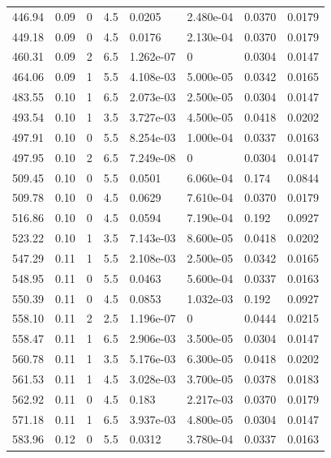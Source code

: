 \documentclass[preview]{standalone}
\begin{document}
{{{\begin{tabular}{L{1.2cm}C{1.2cm} C{0.3cm}C{0.5cm} C{1.4cm}C{1.4cm} C{1.4cm}C{1.4cm}}
  446.94  &  0.09  & 0     & 4.5 &  0.0205  & 2.480e-04  & 0.0370 &  0.0179   \\ 
  449.18  &  0.09  & 0     & 4.5 &  0.0176  & 2.130e-04  & 0.0370 &  0.0179   \\ 
  460.31  &  0.09  & 2     & 6.5 &  1.262e-07  & 0  & 0.0304 &  0.0147   \\ 
  464.06  &  0.09  & 1     & 5.5 &  4.108e-03  & 5.000e-05  & 0.0342 &  0.0165   \\ 
  483.55  &  0.10  & 1     & 6.5 &  2.073e-03  & 2.500e-05  & 0.0304 &  0.0147   \\ 
  493.54  &  0.10  & 1     & 3.5 &  3.727e-03  & 4.500e-05  & 0.0418 &  0.0202   \\ 
  497.91  &  0.10  & 0     & 5.5 &  8.254e-03  & 1.000e-04  & 0.0337 &  0.0163   \\ 
  497.95  &  0.10  & 2     & 6.5 &  7.249e-08  & 0  & 0.0304 &  0.0147   \\ 
  509.45  &  0.10  & 0     & 5.5 &  0.0501  & 6.060e-04  & 0.174 &  0.0844   \\ 
  509.78  &  0.10  & 0     & 4.5 &  0.0629  & 7.610e-04  & 0.0370 &  0.0179   \\ 
  516.86  &  0.10  & 0     & 4.5 &  0.0594  & 7.190e-04  & 0.192 &  0.0927   \\ 
  523.22  &  0.10  & 1     & 3.5 &  7.143e-03  & 8.600e-05  & 0.0418 &  0.0202   \\ 
  547.29  &  0.11  & 1     & 5.5 &  2.108e-03  & 2.500e-05  & 0.0342 &  0.0165   \\ 
  548.95  &  0.11  & 0     & 5.5 &  0.0463  & 5.600e-04  & 0.0337 &  0.0163   \\ 
  550.39  &  0.11  & 0     & 4.5 &  0.0853  & 1.032e-03  & 0.192 &  0.0927   \\ 
  558.10  &  0.11  & 2     & 2.5 &  1.196e-07  & 0  & 0.0444 &  0.0215   \\ 
  558.47  &  0.11  & 1     & 6.5 &  2.906e-03  & 3.500e-05  & 0.0304 &  0.0147   \\ 
  560.78  &  0.11  & 1     & 3.5 &  5.176e-03  & 6.300e-05  & 0.0418 &  0.0202   \\ 
  561.53  &  0.11  & 1     & 4.5 &  3.028e-03  & 3.700e-05  & 0.0378 &  0.0183   \\ 
  562.92  &  0.11  & 0     & 4.5 &  0.183  & 2.217e-03  & 0.0370 &  0.0179   \\ 
  571.18  &  0.11  & 1     & 6.5 &  3.937e-03  & 4.800e-05  & 0.0304 &  0.0147   \\ 
  583.96  &  0.12  & 0     & 5.5 &  0.0312  & 3.780e-04  & 0.0337 &  0.0163   \\ 

\end{tabular}}}}
\end{document}
